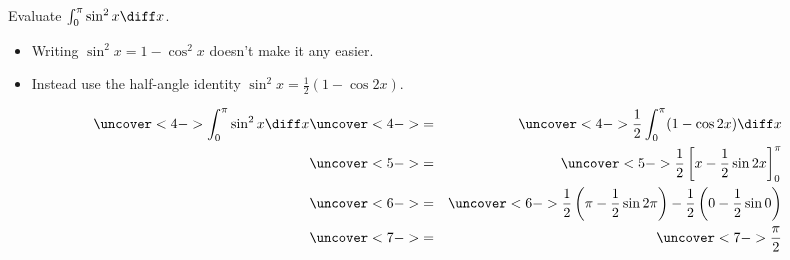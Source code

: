 \begin{frame}
\begin{example}[Example 3, p. 497]
Evaluate $\int_0^{\pi} \sin^2 x \diff x$.
\begin{itemize}
\item<2->  Writing $\sin^2 x = 1 - \cos^2 x$ doesn't make it any easier.
\item<3->  Instead use the half-angle identity $\sin^2 x = \frac{1}{2}(1-\cos 2x)$.
\end{itemize}
\abovedisplayskip=0pt
\belowdisplayskip=0pt
\begin{eqnarray*}
\uncover<4->{%
\int_0^{\pi} \sin^2 x \diff x 
}%
& \uncover<4->{ = } &%
\uncover<4->{%
\frac{1}{2}\int_0^{\pi} (1-\cos 2x)\diff x
}\\%
& \uncover<5->{ = } &%
\uncover<5->{%
\frac{1}{2}\left[ x - \frac{1}{2}\sin 2x\right]_0^{\pi}
}\\%
& \uncover<6->{ = } &%
\uncover<6->{%
\frac{1}{2}\left( \pi - \frac{1}{2}\sin 2\pi\right) %
 - \frac{1}{2}\left( 0 - \frac{1}{2}\sin 0\right)
}\\%
& \uncover<7->{ = } &%
\uncover<7->{%
\frac{\pi}{2}
}\\%
\end{eqnarray*}
\end{example}
\end{frame}
